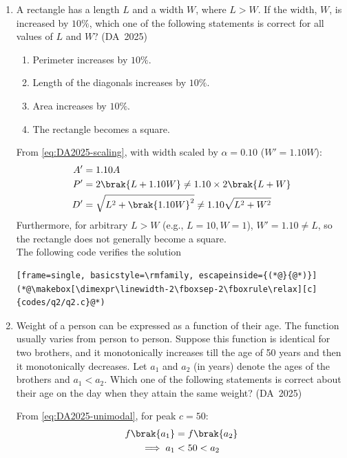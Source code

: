 \begin{enumerate}[label=\thesubsection.\arabic*, ref=\thesubsection.\theenumi]
	\item 
	A rectangle has a length $L$ and a width $W$, where $L > W$. If the width, $W$, is increased by $10\%$, which one of the following statements is correct for all values of $L$ and $W$?
	\hfill (DA~2025)
	\begin{enumerate}
		\item Perimeter increases by $10\%$.
		\item Length of the diagonals increases by $10\%$.
		\item Area increases by $10\%$.
		\item The rectangle becomes a square.
	\end{enumerate}
\solution
From \eqref{eq:DA2025-scaling}, with width scaled by $\alpha = 0.10$ ($W' = 1.10W$):
\begin{align}
	A' &= 1.10 A
	\\
	P' &= 2\brak{L + 1.10W} \neq 1.10\times 2\brak{L + W}
	\\
	D' &= \sqrt{L^2 + \brak{1.10W}^2} \neq 1.10\sqrt{L^2 + W^2}
\end{align}
Furthermore, for arbitrary $L > W$ (e.g., $L = 10, W = 1$), $W' = 1.10 \neq L$, so the rectangle does not generally become a square. 
\\
The following code verifies the solution
	\begin{lstlisting}[frame=single, basicstyle=\rmfamily, escapeinside={(*@}{@*)}]
(*@\makebox[\dimexpr\linewidth-2\fboxsep-2\fboxrule\relax][c]{codes/q2/q2.c}@*)
	\end{lstlisting}
	\item 
	Weight of a person can be expressed as a function of their age. The function usually varies from person to person. Suppose this function is identical for two brothers, and it monotonically increases till the age of 50 years and then it monotonically decreases. Let $a_1$ and $a_2$ (in years) denote the ages of the brothers and $a_1 < a_2$. Which one of the following statements is correct about their age on the day when they attain the same weight?
	\hfill (DA~2025)
	\begin{enumerate}
	\end{enumerate}
	\solution
	From \eqref{eq:DA2025-unimodal}, for peak $c = 50$:
	\begin{align}
		f\brak{a_1} &= f\brak{a_2}
		\\
		\implies a_1 &< 50 < a_2
	\end{align}
	

\end{enumerate}
